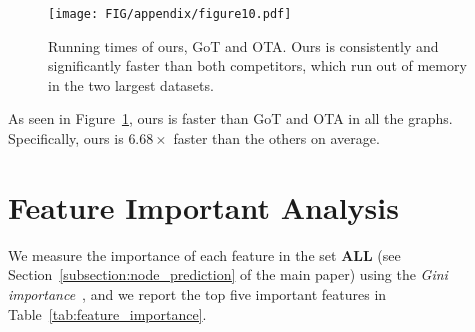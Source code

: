 


\begin{figure}[t]
    \texttt{[image: FIG/appendix/figure10.pdf]}
    \vspace{-2mm}
    \caption{\label{fig:got_time} 
    Running times of ours, GoT and OTA. Ours is consistently and significantly faster than both competitors, which run out of memory in the two largest datasets.}
\end{figure}

 As seen in Figure~\ref{fig:got_time}, ours is faster than GoT and OTA in all the graphs. Specifically, ours is $6.68\times$ faster than the others on average. 

\section{Feature Important Analysis}
\label{sec:appendix:feature_importance}
We measure the importance of each feature in the set \textbf{ALL} (see Section~\ref{subsection:node_prediction} of the main paper) using the \textit{Gini importance}~\cite{loh2011classification}, and we report the top five important features in Table~\ref{tab:feature_importance}.
